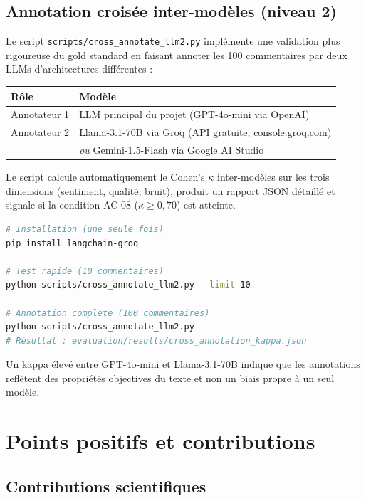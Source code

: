 \documentclass[12pt, a4paper]{article}
\begin{document}
\subsection{Annotation croisée inter-modèles (niveau 2)}

Le script \texttt{scripts/cross\_annotate\_llm2.py} implémente une validation
plus rigoureuse du gold standard en faisant annoter les 100 commentaires par
deux LLMs d'architectures différentes :

\begin{center}
\begin{tabular}{ll}
\toprule
Rôle & Modèle \\
\midrule
Annotateur 1 & LLM principal du projet (GPT-4o-mini via OpenAI) \\
Annotateur 2 & Llama-3.1-70B via Groq (API gratuite, \href{https://console.groq.com}{console.groq.com}) \\
             & \textit{ou} Gemini-1.5-Flash via Google AI Studio \\
\bottomrule
\end{tabular}
\end{center}

Le script calcule automatiquement le Cohen's $\kappa$ inter-modèles sur les trois
dimensions (sentiment, qualité, bruit), produit un rapport JSON détaillé et signale
si la condition AC-08 ($\kappa \geq 0{,}70$) est atteinte.

\begin{lstlisting}[language=bash]
# Installation (une seule fois)
pip install langchain-groq

# Test rapide (10 commentaires)
python scripts/cross_annotate_llm2.py --limit 10

# Annotation complète (100 commentaires)
python scripts/cross_annotate_llm2.py
# Résultat : evaluation/results/cross_annotation_kappa.json
\end{lstlisting}

Un kappa élevé entre GPT-4o-mini et Llama-3.1-70B indique que les annotations
reflètent des propriétés objectives du texte et non un biais propre à un seul modèle.

\section{Points positifs et contributions}

\subsection{Contributions scientifiques}
\end{document}
